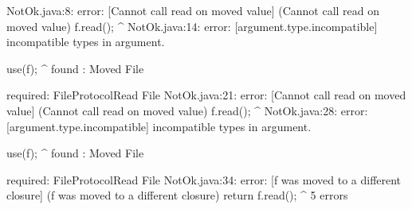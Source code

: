 \lstset{language=,caption=New Mungo output}
\begin{code}
NotOk.java:8: error: [Cannot call read on moved value] (Cannot call read on moved value)
    f.read();
          ^
NotOk.java:14: error: [argument.type.incompatible] incompatible types in argument.

    use(f);
        ^
  found   : Moved File

  required: FileProtocol{Read} File
NotOk.java:21: error: [Cannot call read on moved value] (Cannot call read on moved value)
    f.read();
          ^
NotOk.java:28: error: [argument.type.incompatible] incompatible types in argument.

    use(f);
        ^
  found   : Moved File

  required: FileProtocol{Read} File
NotOk.java:34: error: [f was moved to a different closure] (f was moved to a different closure)
      return f.read();
             ^
5 errors
\end{code}

